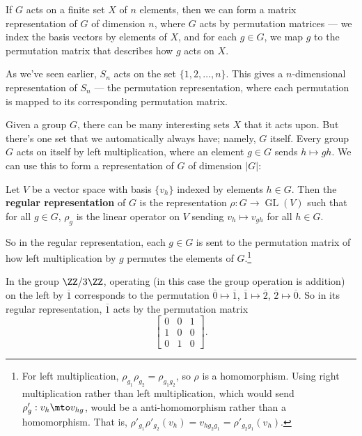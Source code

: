 If $G$ acts on a finite set $X$ of $n$ elements, then we can form a matrix representation of $G$ of dimension $n$, where $G$ acts by permutation matrices --- we index the basis vectors by elements of $X$, and for each $g \in G$, we map $g$ to the permutation matrix that describes how $g$ acts on $X$. 

\begin{example}
    As we've seen earlier, $S_n$ acts on the set $\{1, 2, \ldots, n\}$. This gives a $n$-dimensional representation of $S_n$ --- the permutation representation, where each permutation is mapped to its corresponding permutation matrix. 
\end{example}

Given a group $G$, there can be many interesting sets $X$ that it acts upon. But there's one set that we automatically always have; namely, $G$ itself. Every group $G$ acts on itself by left multiplication, where an element $g \in G$ sends $h \mapsto gh$. We can use this to form a representation of $G$ of dimension $\lvert G \rvert$: 

\begin{definition}
    Let $V$ be a vector space with basis $\{v_h\}$ indexed by elements $h \in G$. Then the \textbf{regular representation} of $G$ is the representation $\rho : G \to \operatorname{GL}(V)$ such that for all $g \in G$, $\rho_g$ is the linear operator on $V$ sending $v_h \mapsto v_{gh}$ for all $h \in G$. 
\end{definition}

So in the regular representation, each $g \in G$ is sent to the permutation matrix of how left multiplication by $g$ permutes the elements of $G$.\footnote{For left multiplication, $\rho_{g_1}\rho_{g_2} = \rho_{g_1g_2}$, so $\rho$ is a homomorphism. Using right multiplication rather than left multiplication, which would send $\rho'_g: v_h \mto v_{hg}$, would be a anti-homomorphism rather than a homomorphism. That is, $\rho'_{g_1} \rho'_{g_2}(v_h) = v_{hg_2g_1} = \rho'_{g_2g_1}(v_h).$}

\begin{example}
    In the group $\ZZ/3\ZZ$, operating (in this case the group operation is addition) on the left by $\overline{1}$ corresponds to the permutation $\overline{0} \mapsto \overline{1}$, $\overline{1} \mapsto \overline{2}$, $\overline{2} \mapsto \overline{0}$. So in its regular representation, $\overline{1}$ acts by the permutation matrix \[\begin{bmatrix} 0 & 0 & 1 \\ 1 & 0 & 0 \\ 0 & 1 & 0 \end{bmatrix}.\] 
\end{example}

